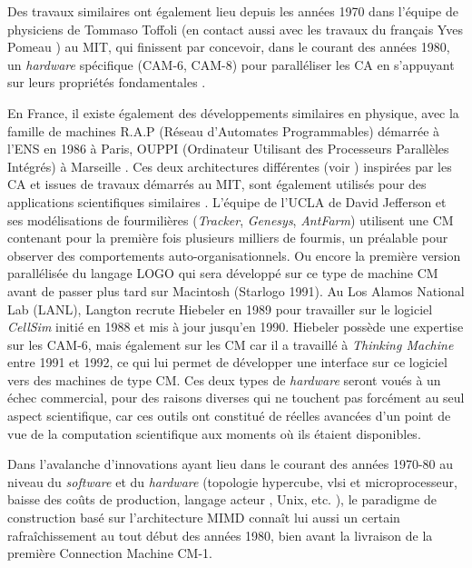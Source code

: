 Des travaux similaires ont également lieu depuis les années 1970 dans l’équipe de physiciens de Tommaso Toffoli (en contact aussi avec les travaux du français Yves Pomeau \autocites{Toffoli2005,Toffoli1987}) au MIT, qui finissent par concevoir, dans le courant des années 1980, un \textit{hardware} spécifique (CAM-6, CAM-8) pour paralléliser les CA en s’appuyant sur leurs propriétés fondamentales \autocite{Toffoli1987}.


En France, il existe également des développements similaires en physique, avec la famille de machines R.A.P (Réseau d’Automates Programmables) démarrée à l'ENS en 1986 à Paris, OUPPI (Ordinateur Utilisant des Processeurs Parallèles Intégrés) à Marseille \autocites{Manneville1989, Hiebeler1990}. Ces deux architectures différentes (voir \autocite{Hillis1981}) inspirées par les CA \autocites{Hillis1984, Hillis1989, Toffoli1987} et issues de travaux démarrés au MIT, sont également utilisés pour des applications scientifiques similaires \autocite{Toffoli2005}. L’équipe de l’UCLA de David Jefferson et ses modélisations de fourmilières (\textit{Tracker}, \textit{Genesys}, \textit{AntFarm}) utilisent une CM contenant pour la première fois plusieurs milliers de fourmis, un préalable pour observer des comportements auto-organisationnels. Ou encore la première version parallélisée du langage LOGO qui sera développé sur ce type de machine CM avant de passer plus tard sur Macintosh (Starlogo 1991). Au Los Alamos National Lab (LANL), Langton recrute Hiebeler en 1989 pour travailler sur le logiciel \textit{CellSim} initié en 1988 et mis à jour jusqu’en 1990. Hiebeler possède une expertise sur les CAM-6, mais également sur les CM car il a travaillé à \textit{Thinking Machine} entre 1991 et 1992, ce qui lui permet de développer une interface sur ce logiciel vers des machines de type CM. Ces deux types de \textit{hardware} seront voués à un échec commercial, pour des raisons diverses qui ne touchent pas forcément au seul aspect scientifique, car ces outils ont constitué de réelles avancées d’un point de vue de la computation scientifique aux moments où ils étaient disponibles.

Dans l'avalanche d'innovations ayant lieu dans le courant des années 1970-80 au niveau du \textit{software} et du \textit{hardware} (topologie hypercube, vlsi et microprocesseur, baisse des coûts de production, langage acteur \autocite{Hewitt1973}, Unix, etc. ), le paradigme de construction basé sur l'architecture MIMD connaît lui aussi un certain rafraîchissement au tout début des années 1980, bien avant la livraison de la première Connection Machine CM-1.

